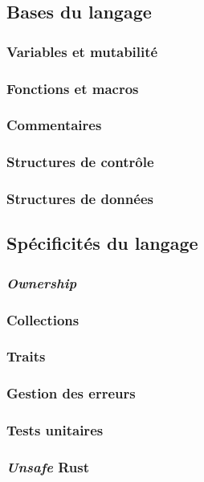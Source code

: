 
\subsection{Bases du langage}
\subsubsection{Variables et mutabilité}

\subsubsection{Fonctions et macros}

\subsubsection{Commentaires}

\subsubsection{Structures de contrôle}

\subsubsection{Structures de données}


\subsection{Spécificités du langage}
\subsubsection{\textit{Ownership}}

\subsubsection{Collections}

\subsubsection{Traits}

\subsubsection{Gestion des erreurs}

\subsubsection{Tests unitaires}

\subsubsection{\textit{Unsafe} Rust}
